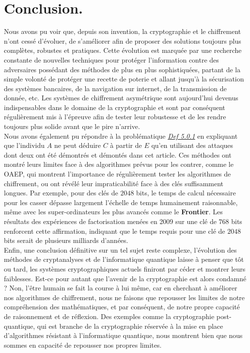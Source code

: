 \documentclass{article}
\begin{document}
\section{Conclusion.}\label{conclusion}

Nous avons pu voir que, depuis son invention, la cryptographie et le
chiffrement n'ont cessé
d'évoluer, de s'améliorer afin de proposer des solutions toujours plus
complètes, robustes et pratiques. Cette évolution est marquée par une
recherche constante de nouvelles techniques pour protéger l'information
contre des adversaires possédant des méthodes de plus en plus sophistiquées, partant de la
simple volonté de protéger une recette de poterie et allant jusqu'à la
sécurisation des systèmes bancaires, de la navigation sur internet, de
la transmission de donnée, etc. Les systèmes de chiffrement asymétrique
sont aujourd'hui devenus indispensables dans le domaine de la
cryptographie et sont par conséquent régulièrement mis à l'épreuve afin
de tester leur robustesse et de les rendre toujours plus solide avant
que le pire n'arrive. \\

Nous avons également pu répondre à la problématique
\textit{\hyperref[def-5.0.1]{Def 5.0.1}} en expliquant que l'individu \(A\)
ne peut déduire \(C\) à partir de \(E\) qu'en utilisant des attaques
dont deux ont été démontrés et démontés dans cet article. Ces méthodes
ont montré leurs limites face à des algorithmes prévus pour les contrer,
comme le OAEP, qui montrent l'importance de régulièrement tester les
algorithmes de chiffrement, ou ont révélé leur impraticabilité face à
des clés suffisamment longues. Par exemple, pour des clés de \(2048\)
bits, le temps de calcul nécessaire pour les casser dépasse largement
l'échelle de temps humainement raisonnable, même avec les
super-ordinateurs les plus avancés comme le \textbf{Frontier}. Les
résultats des expériences de factorisation menées en 2009 sur une clé de
\(768\) bits renforcent cette affirmation, indiquant que le temps requis
pour une clé de \(2048\) bits serait de plusieurs milliards d'années. \\

Enfin, une conclusion définitive sur un tel sujet reste complexe, l'évolution des méthodes de cryptanalyses et de l'informatique quantique laisse à penser que tôt ou tard, les systèmes cryptographiques actuels finiront par céder et montrer leurs faiblesses. Est-ce pour autant que l'avenir de la cryptographie est alors condamné ? Non, l'être humain se fait la course à lui même, car en cherchant à améliorer nos algorithmes de chiffrement, nous ne faisons que repousser les limites de notre compréhension des mathématiques, et par conséquent, de notre propre capacité de raisonnement et de réflexion. Des exemples comme la cryptographie post-quantique, qui est branche de la cryptographie réservée à la mise en place d'algorithmes résistant à l'informatique quantique, nous montrent bien que nous sommes en capacité de repousser nos propres limites.
\end{document}
